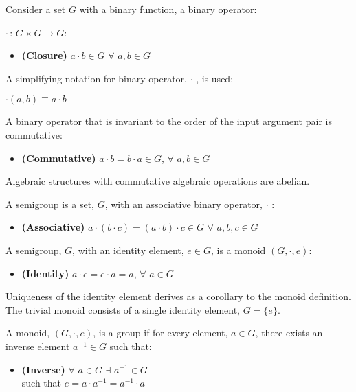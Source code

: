 \documentclass[aps,twocolumn,secnumarabic,nobalancelastpage,amsmath,amssymb,
amsthm,nofootinbib,parskip=full]{revtex4}
\begin{document}
Consider a set $G$ with a binary function, a binary operator:
\begin{center}
$\cdot\, {:}\, G \times G \to G$:
\end{center}

\begin{itemize}
\item \textbf{\small (Closure)} $a\cdot b\in G$ $\forall$ $a,b\in G$
\end{itemize}

A simplifying notation for binary operator, $\cdot$ , is used:

\begin{center}
 $\cdot(a,b)\equiv a\cdot b$
\end{center}

A binary operator that is invariant to the order of the input argument pair
is commutative:

\begin{itemize}
\item \textbf{\small (Commutative)} $a\cdot b=b\cdot a\in G$, $\forall$ $a,b\in G$
\end{itemize}

Algebraic structures with commutative algebraic operations are abelian.

A semigroup is a set, $G$, with an associative binary operator, $\cdot$ :

\begin{itemize}
\item \textbf{\small (Associative)}
  $a\cdot (b\cdot c) = (a\cdot b)\cdot c\in G$ $\forall$ $a,b,c\in G$
\end{itemize}

A semigroup, $G$, with an identity element, $e\in G$, is a monoid $(G,\cdot,e)$:

\begin{itemize}
\item \textbf{\small (Identity)} $a\cdot e=e\cdot a=a$, $\forall$ $a \in G$
\end{itemize}

Uniqueness of the identity element derives as a corollary to the monoid definition.
The trivial monoid consists of a single identity element, $G=\{e\}$.

A monoid, $(G,\cdot,e)$, is a group if for every element, $a\in G$, 
there exists an inverse element $a^{-1}\in G$ such that:

\begin{itemize}
\item \textbf{\small (Inverse)} $\forall$ $a\in G$ $\exists$ $a^{-1}\in G$ \\
  such that $e=a\cdot a^{-1}=a^{-1}\cdot a$
\end{itemize}
\end{document}
